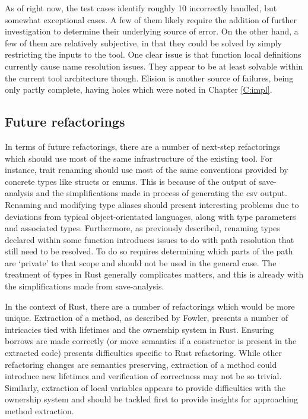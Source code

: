 As of right now, the test cases identify roughly 10 incorrectly handled, but somewhat exceptional cases. A few of them likely require the addition of further investigation to determine their underlying source of error. On the other hand, a few of them are relatively subjective, in that they could be solved by simply restricting the inputs to the tool. One clear issue is that function local definitions currently cause name resolution issues. They appear to be at least solvable within the current tool architecture though. Elision is another source of failures, being only partly complete, having holes which were noted in Chapter \ref{C:impl}.

\subsection{Future refactorings}
In terms of future refactorings, there are a number of next-step refactorings which should use most of the same infrastructure of the existing tool. For instance, trait renaming should use most of the same conventions provided by concrete types like structs or enums. This is because of the output of save-analysis and the simplifications made in process of generating the csv output. Renaming and modifying type aliases should present interesting problems due to deviations from typical object-orientated languages, along with type parameters and associated types. Furthermore, as previously described, renaming types declared within some function introduces issues to do with path resolution that still need to be resolved. To do so requires determining which parts of the path are `private' to that scope and should not be used in the general case. The treatment of types in Rust generally complicates matters, and this is already with the simplifications made from save-analysis.

In the context of Rust, there are a number of refactorings which would be more unique. Extraction of a method, as described by Fowler, presents a number of intricacies tied with lifetimes and the ownership system in Rust. Ensuring borrows are made correctly (or move semantics if a constructor is present in the extracted code) presents difficulties specific to Rust refactoring. While other refactoring changes are semantics preserving, extraction of a method could introduce new lifetimes and verification of correctness may not be so trivial. Similarly, extraction of local variables appears to provide difficulties with the ownership system and should be tackled first to provide insights for approaching method extraction.

